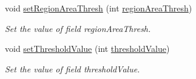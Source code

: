 \begin{DoxyCompactItemize}
void \hyperlink{classmultiscale_1_1analysis_1_1RegionDetector_a5cf10aea88e85198ce54df0e94e6d1a7}{set\-Region\-Area\-Thresh} (int \hyperlink{classmultiscale_1_1analysis_1_1RegionDetector_a1f637073a3d946d000dceed01412f19a}{region\-Area\-Thresh})
\begin{DoxyCompactList}\small\item\em Set the value of field region\-Area\-Thresh. \end{DoxyCompactList}\item 
void \hyperlink{classmultiscale_1_1analysis_1_1RegionDetector_a066e87a1f134194dabfc760d241b8ab2}{set\-Threshold\-Value} (int \hyperlink{classmultiscale_1_1analysis_1_1RegionDetector_a0f7469d124c0b906d199e00ea5713007}{threshold\-Value})
\begin{DoxyCompactList}\small\item\em Set the value of field threshold\-Value. \end{DoxyCompactList}\end{DoxyCompactItemize}
